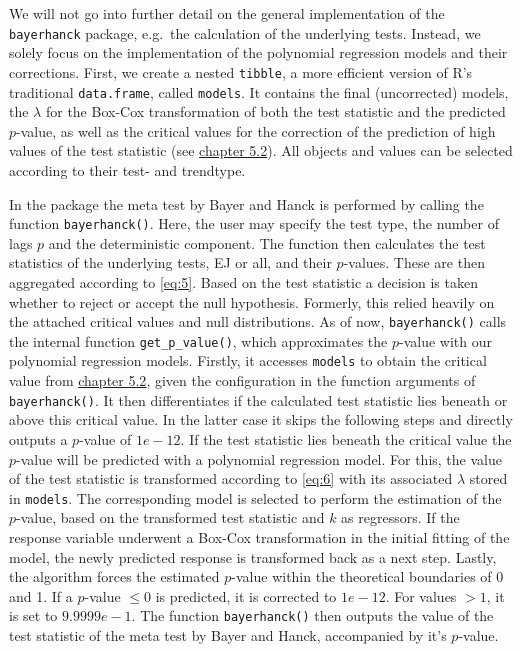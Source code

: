 \documentclass[12pt,a4paper]{article}
\begin{document}
We will not go into further detail on the general implementation of the
\texttt{bayerhanck} package, e.g.~the calculation of the underlying
tests. Instead, we solely focus on the implementation of the polynomial
regression models and their corrections. First, we create a nested
\texttt{tibble}, a more efficient version of R's traditional
\texttt{data.frame}, called \texttt{models}. It contains the final
(uncorrected) models, the \(\lambda\) for the Box-Cox transformation of
both the test statistic and the predicted \(p\)-value, as well as the
critical values for the correction of the prediction of high values of
the test statistic (see
\protect\hyperlink{correction-for-high-values-of-the-test-statistic}{chapter
5.2}). All objects and values can be selected according to their test-
and trendtype.

In the package the meta test by Bayer and Hanck is performed by calling
the function \texttt{bayerhanck()}. Here, the user may specify the test
type, the number of lags \(p\) and the deterministic component. The
function then calculates the test statistics of the underlying tests, EJ
or all, and their \(p\)-values. These are then aggregated according to
\eqref{eq:5}. Based on the test statistic a decision is taken whether to
reject or accept the null hypothesis. Formerly, this relied heavily on
the attached critical values and null distributions. As of now,
\texttt{bayerhanck()} calls the internal function
\texttt{get\_p\_value()}, which approximates the \(p\)-value with our
polynomial regression models. Firstly, it accesses \texttt{models} to
obtain the critical value from
\protect\hyperlink{correction-for-high-values-of-the-test-statistic}{chapter
5.2}, given the configuration in the function arguments of
\texttt{bayerhanck()}. It then differentiates if the calculated test
statistic lies beneath or above this critical value. In the latter case
it skips the following steps and directly outputs a \(p\)-value of
\(1e-12\). If the test statistic lies beneath the critical value the
\(p\)-value will be predicted with a polynomial regression model. For
this, the value of the test statistic is transformed according to
\ref{eq:6} with its associated \(\lambda\) stored in \texttt{models}.
The corresponding model is selected to perform the estimation of the
\(p\)-value, based on the transformed test statistic and \(k\) as
regressors. If the response variable underwent a Box-Cox transformation
in the initial fitting of the model, the newly predicted response is
transformed back as a next step. Lastly, the algorithm forces the
estimated \(p\)-value within the theoretical boundaries of 0 and 1. If a
\(p\)-value \(\leq 0\) is predicted, it is corrected to \(1e-12\). For
values \(> 1\), it is set to \(9.9999e-1\). The function
\texttt{bayerhanck()} then outputs the value of the test statistic of
the meta test by Bayer and Hanck, accompanied by it's \(p\)-value.
\end{document}
